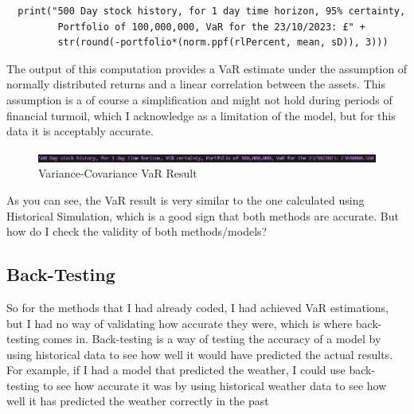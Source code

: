 \documentclass{article}
\begin{document}
\begin{verbatim}
  print("500 Day stock history, for 1 day time horizon, 95% certainty, 
         Portfolio of 100,000,000, VaR for the 23/10/2023: £" + 
         str(round(-portfolio*(norm.ppf(rlPercent, mean, sD)), 3)))
\end{verbatim}

The output of this computation provides a VaR estimate under the assumption of normally distributed returns and a linear correlation between the assets. This assumption is a of course a simplification and might not hold during periods of financial turmoil, which I acknowledge as a limitation of the model, but for this data it is acceptably accurate.\\\vspace{0.3cm}

\begin{figure}[h]
  \centering
  \includegraphics[width=1\textwidth]{Images/Variance-Covariance Command Line Result.png}
  \caption{Variance-Covariance VaR Result}
  \label{fig:Variance-Covariance Command Line Result}
\end{figure}

As you can see, the VaR result is very similar to the one calculated using Historical Simulation, which is a good sign that both methods are accurate. But how do I check the validity of both methods/models?

\subsection{Back-Testing}
So for the methods that I had already coded, I had achieved VaR estimations, but I had no way of validating how accurate they were, which is where back-testing comes in. Back-testing is a way of testing the accuracy of a model by using historical data to see how well it would have predicted the actual results. For example, if I had a model that predicted the weather, I could use back-testing to see how accurate it was by using historical weather data to see how well it has predicted the weather correctly in the past\\\vspace{0.3cm}
\end{document}
